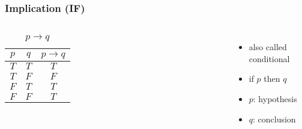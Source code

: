 \documentclass[dvipsnames]{beamer}
\begin{document}
\begin{frame}
  \frametitle{Implication (IF)}

  \begin{columns}
    \begin{table}
      \caption{$p \rightarrow q$}
      \begin{tabular}{|c|c||c|}\hline
        $p$ & $q$ & $p \rightarrow q$\\\hline\hline
        $T$ & $T$ & $T$\\\hline
        $T$ & $F$ & $F$\\\hline
        $F$ & $T$ & $T$\\\hline
        $F$ & $F$ & $T$\\\hline
      \end{tabular}
    \end{table}

    \begin{itemize}
      \item also called \alert{conditional}
      \item if $p$ then $q$

      \medskip
      \item $p$: \alert{hypothesis}
      \item $q$: \alert{conclusion}

    \end{itemize}
  \end{columns}
\end{frame}
\end{document}
